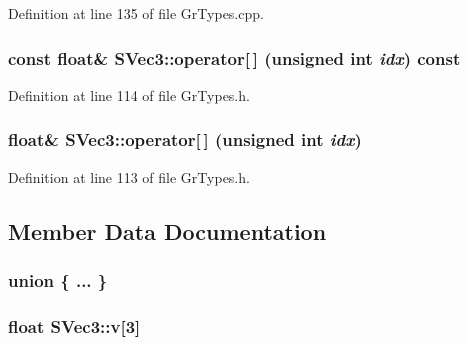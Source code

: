 Definition at line 135 of file GrTypes.cpp.\hypertarget{struct_s_vec3_200414903bec9b6bab6946b0d900dc40}{
\subsubsection[{operator[]}]{\setlength{\rightskip}{0pt plus 5cm}const float\& SVec3::operator\mbox{[}$\,$\mbox{]} (unsigned int {\em idx}) const}}
\label{struct_s_vec3_200414903bec9b6bab6946b0d900dc40}




Definition at line 114 of file GrTypes.h.\hypertarget{struct_s_vec3_80054be7f9f62d81c5612d69f32ba11c}{
\subsubsection[{operator[]}]{\setlength{\rightskip}{0pt plus 5cm}float\& SVec3::operator\mbox{[}$\,$\mbox{]} (unsigned int {\em idx})}}
\label{struct_s_vec3_80054be7f9f62d81c5612d69f32ba11c}




Definition at line 113 of file GrTypes.h.

\subsection{Member Data Documentation}
\hypertarget{struct_s_vec3_2aaf241ee0bba21d37fa3d21fe2f8538}{
\subsubsection[{"@9}]{\setlength{\rightskip}{0pt plus 5cm}union \{ ... \} }}
\label{struct_s_vec3_2aaf241ee0bba21d37fa3d21fe2f8538}


\hypertarget{struct_s_vec3_e77f7ec6dd4b23199dce3e4dfaee9804}{
\subsubsection[{v}]{\setlength{\rightskip}{0pt plus 5cm}float {\bf SVec3::v}\mbox{[}3\mbox{]}}}
\label{struct_s_vec3_e77f7ec6dd4b23199dce3e4dfaee9804}




